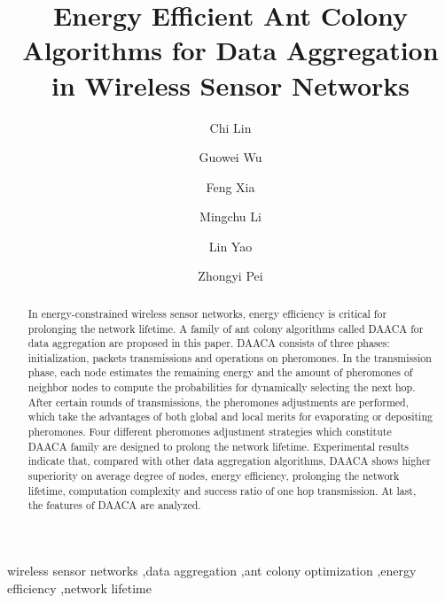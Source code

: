 \documentclass{elsarticle}
\begin{document}
\begin{frontmatter}





\title{Energy Efficient Ant Colony Algorithms for Data Aggregation in Wireless Sensor Networks}


\author[add1]{Chi Lin}
\author[add1]{Guowei Wu}
\author[add1]{Feng Xia}
\author[add1]{Mingchu Li}
\author[add1]{Lin Yao}
\author[add1]{Zhongyi Pei}
\address[add1]{School of Software, Dalian University of Technology, China}


\begin{abstract}
In energy-constrained wireless sensor networks, energy efficiency is critical for prolonging the network lifetime. A family of ant colony algorithms called DAACA for data aggregation are proposed in this paper. DAACA consists of three phases: initialization, packets transmissions and operations on pheromones. In the transmission phase, each node estimates the remaining energy and the amount of pheromones of neighbor nodes to compute the probabilities for dynamically selecting the next hop. After certain rounds of transmissions, the pheromones adjustments are performed, which take the advantages of both global and local merits for evaporating or depositing pheromones. Four different pheromones adjustment strategies which constitute DAACA family are designed to prolong the network lifetime. Experimental results indicate that, compared with other data aggregation algorithms, DAACA shows higher superiority on average degree of nodes, energy efficiency, prolonging the network lifetime, computation complexity and success ratio of one hop transmission. At last, the features of DAACA are analyzed.
\end{abstract}

\begin{keyword}
wireless sensor networks \sep data aggregation \sep ant colony optimization \sep energy efficiency \sep network lifetime

\end{keyword}

\end{frontmatter}
\end{document}
